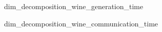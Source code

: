 \documentclass[conference,compsoc]{IEEEtran}
\begin{document}
\begin{figure}[htbp]%
	\centering
	\caption{dim\_decomposition\_wine\_generation\_time}
\end{figure}

\begin{figure}[htbp]%
	\centering
	\caption{dim\_decomposition\_wine\_communication\_time}
\end{figure}
\end{document}
